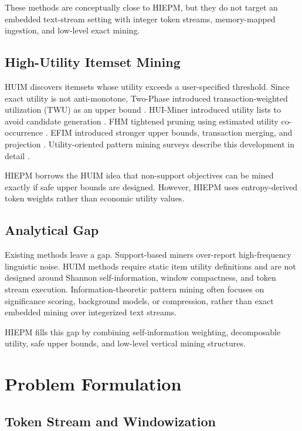\documentclass[11pt,a4paper]{article}
\begin{document}
These methods are conceptually close to HIEPM, but they do not target an embedded text-stream setting with integer token streams, memory-mapped ingestion, and low-level exact mining.

\subsection{High-Utility Itemset Mining}

HUIM discovers itemsets whose utility exceeds a user-specified threshold. Since exact utility is not anti-monotone, Two-Phase introduced transaction-weighted utilization (TWU) as an upper bound \cite{Liu2005TwoPhase}. HUI-Miner introduced utility lists to avoid candidate generation \cite{Liu2012HUIMiner}. FHM tightened pruning using estimated utility co-occurrence \cite{FournierViger2014FHM}. EFIM introduced stronger upper bounds, transaction merging, and projection \cite{Zida2017EFIM}. Utility-oriented pattern mining surveys describe this development in detail \cite{Gan2021UtilitySurvey}.

HIEPM borrows the HUIM idea that non-support objectives can be mined exactly if safe upper bounds are designed. However, HIEPM uses entropy-derived token weights rather than economic utility values.

\subsection{Analytical Gap}

Existing methods leave a gap. Support-based miners over-report high-frequency linguistic noise. HUIM methods require static item utility definitions and are not designed around Shannon self-information, window compactness, and token stream execution. Information-theoretic pattern mining often focuses on significance scoring, background models, or compression, rather than exact embedded mining over integerized text streams.

HIEPM fills this gap by combining self-information weighting, decomposable utility, safe upper bounds, and low-level vertical mining structures.

\section{Problem Formulation}

\subsection{Token Stream and Windowization}
\end{document}
